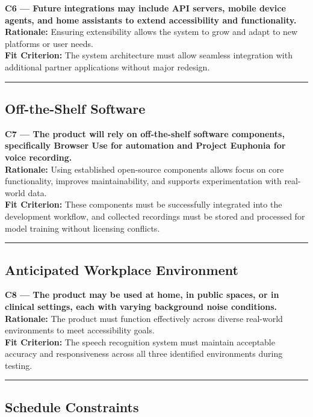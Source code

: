 \documentclass[11pt]{article}
\begin{document}
\noindent\textbf{C6 — Future integrations may include API servers, mobile device agents, and home assistants to extend accessibility and functionality.}\\
\textbf{Rationale:} Ensuring extensibility allows the system to grow and adapt to new platforms or user needs.\\
\textbf{Fit Criterion:} The system architecture must allow seamless integration with additional partner applications without major redesign.
\par\noindent\rule{\textwidth}{0.4pt}


\subsection{Off-the-Shelf Software}

\noindent\textbf{C7 — The product will rely on off-the-shelf software components, specifically Browser Use for automation and Project Euphonia for voice recording.}\\
\textbf{Rationale:} Using established open-source components allows focus on core functionality, improves maintainability, and supports experimentation with real-world data.\\
\textbf{Fit Criterion:} These components must be successfully integrated into the development workflow, and collected recordings must be stored and processed for model training without licensing conflicts.
\par\noindent\rule{\textwidth}{0.4pt}


\subsection{Anticipated Workplace Environment}

\noindent\textbf{C8 — The product may be used at home, in public spaces, or in clinical settings, each with varying background noise conditions.}\\
\textbf{Rationale:} The product must function effectively across diverse real-world environments to meet accessibility goals.\\
\textbf{Fit Criterion:} The speech recognition system must maintain acceptable accuracy and responsiveness across all three identified environments during testing.
\par\noindent\rule{\textwidth}{0.4pt}


\subsection{Schedule Constraints}
\end{document}
